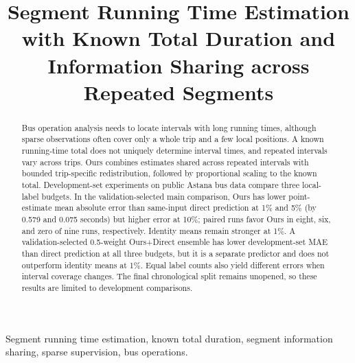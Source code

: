 \documentclass[journal]{IEEEtran}
\begin{document}
\title{Segment Running Time Estimation with Known Total Duration and Information Sharing across Repeated Segments}
\author{}
\maketitle
\begin{abstract}
Bus operation analysis needs to locate intervals with long running times, although sparse observations often cover only a whole trip and a few local positions. A known running-time total does not uniquely determine interval times, and repeated intervals vary across trips. Ours combines estimates shared across repeated intervals with bounded trip-specific redistribution, followed by proportional scaling to the known total. Development-set experiments on public Astana bus data compare three local-label budgets. In the validation-selected main comparison, Ours has lower point-estimate mean absolute error than same-input direct prediction at 1\% and 5\% (by 0.579 and 0.075 seconds) but higher error at 10\%; paired runs favor Ours in eight, six, and zero of nine runs, respectively. Identity means remain stronger at 1\%. A validation-selected 0.5-weight Ours+Direct ensemble has lower development-set MAE than direct prediction at all three budgets, but it is a separate predictor and does not outperform identity means at 1\%. Equal label counts also yield different errors when interval coverage changes. The final chronological split remains unopened, so these results are limited to development comparisons.
\end{abstract}
\begin{IEEEkeywords}
Segment running time estimation, known total duration, segment information sharing, sparse supervision, bus operations.
\end{IEEEkeywords}







\end{document}
